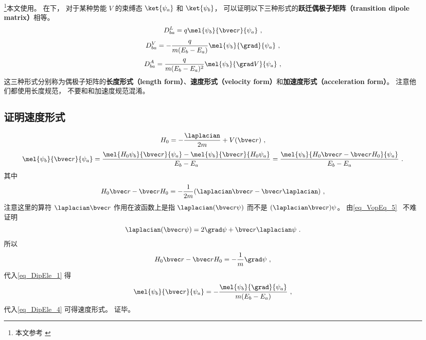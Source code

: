 

\footnote{本文参考 \cite{Bransden}}本文使用。 在下， 对于某种势能 $V$ 的束缚态 $\ket{\psi_a}$ 和 $\ket{\psi_b}$， 可以证明以下三种形式的\textbf{跃迁偶极子矩阵（transition dipole matrix）}相等。
\begin{equation}\label{eq_DipEle_4}
D_{ba}^L = q\mel{\psi_b}{\bvec r}{\psi_a}~,
\end{equation}
\begin{equation}\label{eq_DipEle_3}
D_{ba}^V = -\frac{q}{m(E_b - E_a)}\mel{\psi_b}{\grad}{\psi_a}~,
\end{equation}
\begin{equation}
D_{ba}^A = \frac{q}{m(E_b-E_a)^2} \mel{\psi_b}{\grad V}{\psi_a}~,
\end{equation}
这三种形式分别称为偶极子矩阵的\textbf{长度形式（length form）}、\textbf{速度形式（velocity form）}和\textbf{加速度形式（acceleration form）}。 注意他们都使用长度规范， 不要和和加速度规范混淆。 %

\subsection{证明速度形式}
\begin{equation}
H_0 = -\frac{\laplacian}{2m} + V(\bvec r)~,
\end{equation}
\begin{equation}\label{eq_DipEle_1}
\mel{\psi_b}{\bvec r}{\psi_a} = \frac{\mel{H_0\psi_b}{\bvec r}{\psi_a} - \mel{\psi_b}{\bvec r}{H_0\psi_a}}{E_b - E_a} = \frac{\mel{\psi_b}{H_0\bvec r - \bvec rH_0}{\psi_a}}{E_b - E_a}~.
\end{equation}
其中
\begin{equation}
H_0\bvec r - \bvec rH_0 = -\frac{1}{2m}(\laplacian \bvec r - \bvec r \laplacian)~,
\end{equation}
注意这里的算符 $\laplacian \bvec r$ 作用在波函数上是指 $\laplacian (\bvec r \psi)$ 而不是 $(\laplacian \bvec r) \psi$。 由\autoref{eq_VopEq_5}~ 不难证明
\begin{equation}
\laplacian (\bvec r \psi) = 2 \grad \psi + \bvec r \laplacian \psi~.
\end{equation}
所以
\begin{equation}
H_0\bvec r - \bvec rH_0 = -\frac{1}{m}\grad \psi~,
\end{equation}
代入\autoref{eq_DipEle_1} 得
\begin{equation}
\mel{\psi_b}{\bvec r}{\psi_a} = -\frac{\mel{\psi_b}{\grad}{\psi_a}}{m(E_b - E_a)}~,
\end{equation}
代入\autoref{eq_DipEle_4} 可得速度形式。 证毕。

